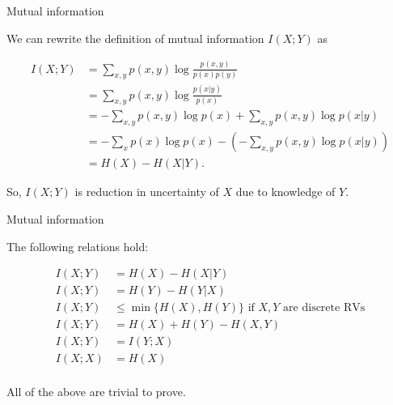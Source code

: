 \documentclass[11pt,compress,t,notes=noshow, xcolor=table]{beamer}
\begin{document}
\begin{vbframe} {Mutual information}

We can rewrite the definition of mutual information $I(X;Y)$ as

\begin{equation*}\begin{aligned}
I(X ; Y) &=\sum_{x, y} p(x, y) \log \frac{p(x, y)}{p(x) p(y)} \\
&=\sum_{x, y} p(x, y) \log \frac{p(x | y)}{p(x)} \\
&=-\sum_{x, y} p(x, y) \log p(x)+\sum_{x, y} p(x, y) \log p(x | y) \\
&=-\sum_{x} p(x) \log p(x)-\left(-\sum_{x, y} p(x, y) \log p(x | y)\right) \\
&=H(X)-H(X | Y).
\end{aligned}\end{equation*}

So, $I(X;Y)$ is reduction in uncertainty of $X$ due to knowledge of $Y$.

\end{vbframe}

\begin{vbframe} {Mutual information}

The following relations hold:

\begin{equation*}
\begin{aligned}
I(X ; Y) &= H(X) - H(X | Y) \\
I(X ; Y) &= H(Y) - H(Y | X) \\
I(X ; Y) &\leq \min\{H(X),H(Y)\} \text { if $X,Y$ are discrete RVs}\\
I(X ; Y) &= H(X) + H(Y) - H(X, Y) \\
I(X ; Y) &= I(Y ; X) \\
I(X ; X) &= H(X)\\
\end{aligned}
\end{equation*}

All of the above are trivial to prove.


\end{vbframe}
\end{document}

